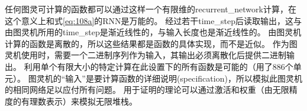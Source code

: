 任何图灵可计算的函数都可以通过这样一个有限维的\gls{recurrent_network}计算，在这个意义上和式\eqref{eq:108a}的\gls{RNN}是万能的。
经过若干\gls{time_step}后读取输出，这与由图灵机所用的\gls{time_step}是渐近线性的，与输入长度也是渐近线性的\citep{Siegelmann+Sontag-1991,Siegelmann-1995,Siegelmann+Sontag-1995,Hyotyniemi-1996}。
由图灵机计算的函数是离散的，所以这些结果都是函数的具体实现，而不是近似。
作为图灵机使用时，需要一个二进制序列作为输入，其输出必须离散化后提供二进制输出。
利用单个有限大小的特定计算在此设置下的所有函数是可能的（\cite{Siegelmann+Sontag-1995}用了886个单元）。
图灵机的``输入''是要计算函数的详细说明(specification)，所以模拟此图灵机的相同网络足以应付所有问题。
用于证明的理论可以通过激活和权重（由无限精度的有理数表示）来模拟无限堆栈。


